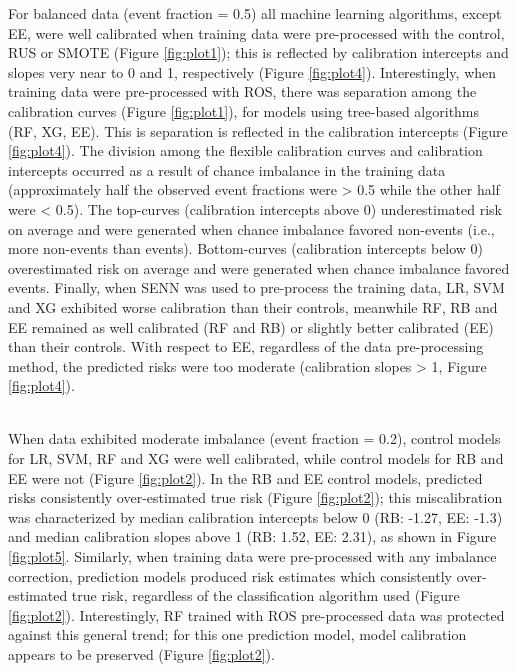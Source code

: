\documentclass[AMA,STIX1COL,]{WileyNJD-v2}
\begin{document}
\hfill\break
For balanced data (event fraction = 0.5) all machine learning
algorithms, except EE, were well calibrated when training data were
pre-processed with the control, RUS or SMOTE (Figure \ref{fig:plot1});
this is reflected by calibration intercepts and slopes very near to 0
and 1, respectively (Figure \ref{fig:plot4}). Interestingly, when
training data were pre-processed with ROS, there was separation among
the calibration curves (Figure \ref{fig:plot1}), for models using
tree-based algorithms (RF, XG, EE). This is separation is reflected in
the calibration intercepts (Figure \ref{fig:plot4}). The division among
the flexible calibration curves and calibration intercepts occurred as a
result of chance imbalance in the training data (approximately half the
observed event fractions were \textgreater{} 0.5 while the other half
were \textless{} 0.5). The top-curves (calibration intercepts above 0)
underestimated risk on average and were generated when chance imbalance
favored non-events (i.e., more non-events than events). Bottom-curves
(calibration intercepts below 0) overestimated risk on average and were
generated when chance imbalance favored events. Finally, when SENN was
used to pre-process the training data, LR, SVM and XG exhibited worse
calibration than their controls, meanwhile RF, RB and EE remained as
well calibrated (RF and RB) or slightly better calibrated (EE) than
their controls. With respect to EE, regardless of the data
pre-processing method, the predicted risks were too moderate
(calibration slopes \textgreater{} 1, Figure \ref{fig:plot4}).\\
\strut \\
When data exhibited moderate imbalance (event fraction = 0.2), control
models for LR, SVM, RF and XG were well calibrated, while control models
for RB and EE were not (Figure \ref{fig:plot2}). In the RB and EE
control models, predicted risks consistently over-estimated true risk
(Figure \ref{fig:plot2}); this miscalibration was characterized by
median calibration intercepts below 0 (RB: -1.27, EE: -1.3) and median
calibration slopes above 1 (RB: 1.52, EE: 2.31), as shown in Figure
\ref{fig:plot5}. Similarly, when training data were pre-processed with
any imbalance correction, prediction models produced risk estimates
which consistently over-estimated true risk, regardless of the
classification algorithm used (Figure \ref{fig:plot2}). Interestingly,
RF trained with ROS pre-processed data was protected against this
general trend; for this one prediction model, model calibration appears
to be preserved (Figure \ref{fig:plot2}).\\
\end{document}
